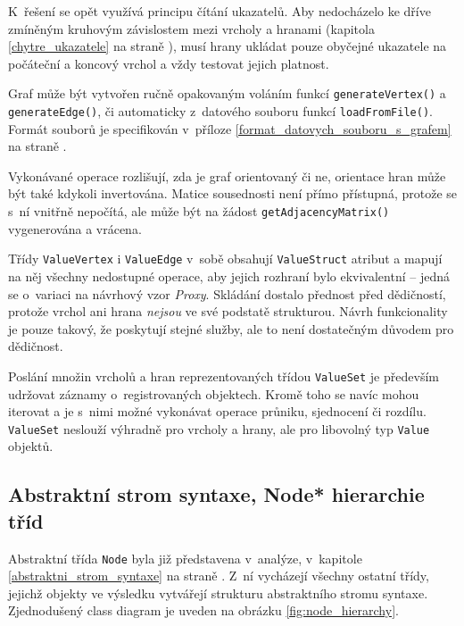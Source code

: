 \documentclass[11pt,twoside,a4paper]{book}
\begin{document}
K~řešení se opět využívá principu čítání ukazatelů. Aby nedocházelo ke dříve zmíněným kruhovým závislostem mezi vrcholy a hranami (kapitola \ref{chytre_ukazatele} na straně \pageref{chytre_ukazatele}), musí hrany ukládat pouze obyčejné ukazatele na počáteční a koncový vrchol a vždy testovat jejich platnost.

Graf může být vytvořen ručně opakovaným voláním funkcí \texttt{generateVertex()} a \texttt{ge\-ne\-ra\-te\-Ed\-ge()}, či automaticky z~datového souboru funkcí \texttt{lo\-ad\-From\-Fi\-le()}. Formát souborů je specifikován v~příloze \ref{format_datovych_souboru_s_grafem} na straně \pageref{format_datovych_souboru_s_grafem}.

Vykonávané operace rozlišují, zda je graf orientovaný či ne, orientace hran může být také kdykoli invertována. Matice sousednosti není přímo přístupná, protože se s~ní vnitřně nepočítá, ale může být na žádost \texttt{getAdjacencyMatrix()} vygenerována a vrácena.

Třídy \texttt{ValueVertex} i \texttt{ValueEdge} v~sobě obsahují \texttt{ValueStruct} atribut a mapují na něj všechny nedostupné operace, aby jejich rozhraní bylo ekvivalentní -- jedná se o~variaci na návrhový vzor \textit{Proxy}. Skládání dostalo přednost před dědičností, protože vrchol ani hrana \textit{nejsou} ve své podstatě strukturou. Návrh funkcionality je pouze takový, že poskytují stejné služby, ale to není dostatečným důvodem pro dědičnost.

Poslání množin vrcholů a hran reprezentovaných třídou \texttt{ValueSet} je především udržovat záznamy o~registrovaných objektech. Kromě toho se navíc mohou iterovat a je s~nimi možné vykonávat operace průniku, sjednocení či rozdílu. \texttt{ValueSet} neslouží výhradně pro vrcholy a hrany, ale pro libovolný typ \texttt{Value} objektů.


\subsection{Abstraktní strom syntaxe, Node* hierarchie tříd}

Abstraktní třída \texttt{Node} byla již představena v~analýze, v~kapitole \ref{abstraktni_strom_syntaxe} na straně \pageref{abstraktni_strom_syntaxe}. Z~ní vycházejí všechny ostatní třídy, jejichž objekty ve výsledku vytvářejí strukturu abstraktního stromu syntaxe. Zjednodušený class diagram je uveden na obrázku \ref{fig:node_hierarchy}.
\end{document}
